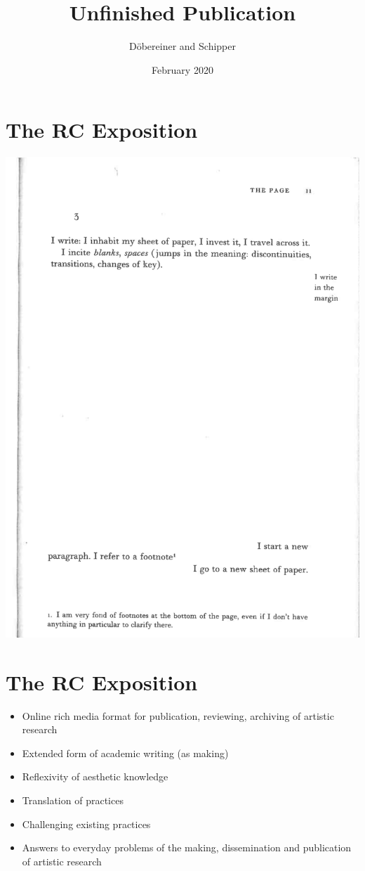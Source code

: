 \documentclass[11pt]{article}
\author{Döbereiner and Schipper}
\date{February 2020}
\title{Unfinished Publication}
\begin{document}
\maketitle


\section*{The RC Exposition}
\label{sec:org46b7c8f}
\begin{center}
\includegraphics[width=.9\linewidth]{./perec.png}
\end{center} 


\section*{The RC Exposition}
\label{sec:org36e412e}
\begin{itemize}
\item Online rich media format for publication, reviewing, archiving of
artistic research
\item Extended form of academic writing (as making)
\item Reflexivity of aesthetic knowledge
\item Translation of practices
\item Challenging existing practices
\item Answers to everyday problems of the making, dissemination and
publication of artistic research
\end{itemize}
\end{document}
